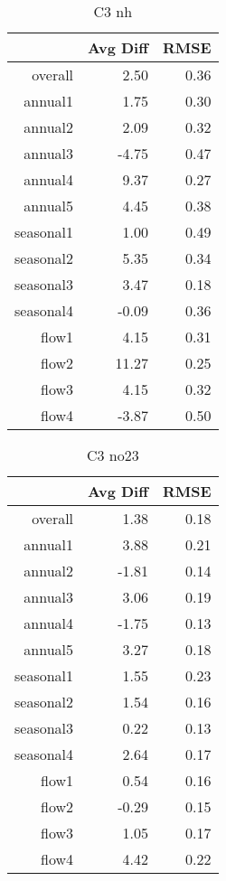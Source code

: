 \begin{table}[H]
\centering
\begin{tabular}{rrr}
  \hline
 & Avg Diff & RMSE \\ 
  \hline
overall & 2.50 & 0.36 \\ 
  annual1 & 1.75 & 0.30 \\ 
  annual2 & 2.09 & 0.32 \\ 
  annual3 & -4.75 & 0.47 \\ 
  annual4 & 9.37 & 0.27 \\ 
  annual5 & 4.45 & 0.38 \\ 
  seasonal1 & 1.00 & 0.49 \\ 
  seasonal2 & 5.35 & 0.34 \\ 
  seasonal3 & 3.47 & 0.18 \\ 
  seasonal4 & -0.09 & 0.36 \\ 
  flow1 & 4.15 & 0.31 \\ 
  flow2 & 11.27 & 0.25 \\ 
  flow3 & 4.15 & 0.32 \\ 
  flow4 & -3.87 & 0.50 \\ 
   \hline
\end{tabular}
\caption{C3 nh} 
\end{table}
\begin{table}[H]
\centering
\begin{tabular}{rrr}
  \hline
 & Avg Diff & RMSE \\ 
  \hline
overall & 1.38 & 0.18 \\ 
  annual1 & 3.88 & 0.21 \\ 
  annual2 & -1.81 & 0.14 \\ 
  annual3 & 3.06 & 0.19 \\ 
  annual4 & -1.75 & 0.13 \\ 
  annual5 & 3.27 & 0.18 \\ 
  seasonal1 & 1.55 & 0.23 \\ 
  seasonal2 & 1.54 & 0.16 \\ 
  seasonal3 & 0.22 & 0.13 \\ 
  seasonal4 & 2.64 & 0.17 \\ 
  flow1 & 0.54 & 0.16 \\ 
  flow2 & -0.29 & 0.15 \\ 
  flow3 & 1.05 & 0.17 \\ 
  flow4 & 4.42 & 0.22 \\ 
   \hline
\end{tabular}
\caption{C3 no23} 
\end{table}

